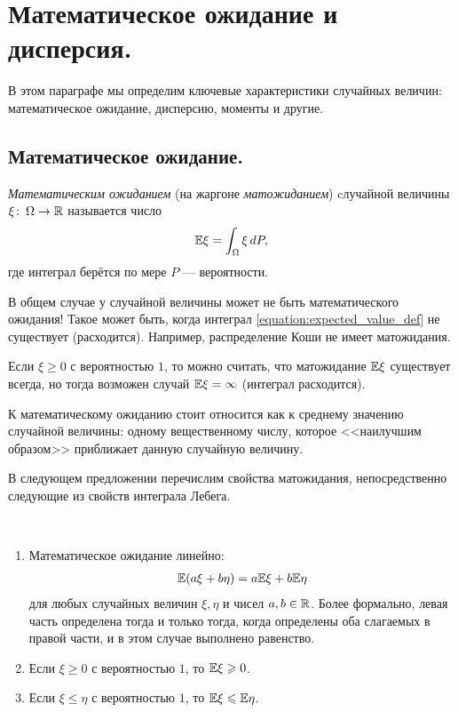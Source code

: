 \documentclass[../main.tex]{subfiles}
\begin{document}
\newpage
\section{Математическое ожидание и дисперсия.}

В этом параграфе мы определим ключевые характеристики случайных величин: математическое ожидание, дисперсию, моменты и другие.

\subsection{Математическое ожидание.}

\begin{df}
 \textit{Математическим ожиданием} (на жаргоне \textit{матожиданием}) cлучайной величины $ \xi \colon \, \Omega \to \mathbb{R} $ называется число
 \begin{align}
  \label{equation:expected_value_def}
  \mathbb E \xi = \int_{\Omega}  \xi\,dP,
 \end{align} где интеграл берётся по мере $ P $ --- вероятности.
\end{df}
\begin{remrk*}
 В общем случае у случайной величины может не быть математического ожидания! Такое может быть, когда интеграл \eqref{equation:expected_value_def} не существует (расходится). Например, распределение Коши не имеет матожидания.

 Если $ \xi \geqslant 0 $ с вероятностью $ 1 $, то можно считать, что матожидание $ \mathbb E \xi $ существует всегда, но тогда возможен случай $ \mathbb E \xi = \infty $ (интеграл расходится).
\end{remrk*}

К математическому ожиданию стоит относится как к среднему значению случайной величины: одному вещественному числу, которое <<наилучшим образом>> приближает данную случайную величину.

В следующем предложении перечислим свойства матожидания, непосредственно следующие из свойств интеграла Лебега.
\begin{prop}\
 \begin{enumerate}
  \item Математическое ожидание линейно:
   \begin{align*}
    \mathbb E(a\xi + b\eta) = a \mathbb E \xi + b \mathbb E \eta
   \end{align*} для любых случайных величин $ \xi,\eta $ и чисел $ a,b\in \mathbb{R} $. Более формально, левая часть определена тогда и только тогда, когда определены оба слагаемых в правой части, и в этом случае выполнено равенство.
  \item Если $ \xi \geqslant 0 $ с вероятностью $ 1 $, то $ \mathbb E\xi\geqslant 0 $.
  \item Если $ \xi \leqslant \eta $ с вероятностью $ 1 $, то $ \mathbb E\xi \leqslant \mathbb E\eta $.
 \end{enumerate}
\end{prop}
\end{document}
